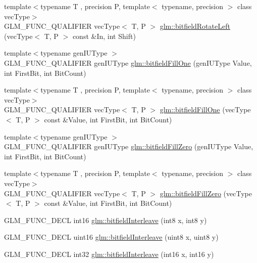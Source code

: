 \begin{DoxyCompactItemize}
\item 
{\footnotesize template$<$typename T , precision P, template$<$ typename, precision $>$ class vec\-Type$>$ }\\G\-L\-M\-\_\-\-F\-U\-N\-C\-\_\-\-Q\-U\-A\-L\-I\-F\-I\-E\-R vec\-Type$<$ T, P $>$ \hyperlink{group__gtc__bitfield_ga410d130917d85b865718e3ebc32cf0ef}{glm\-::bitfield\-Rotate\-Left} (vec\-Type$<$ T, P $>$ const \&In, int Shift)
\item 
{\footnotesize template$<$typename gen\-I\-U\-Type $>$ }\\G\-L\-M\-\_\-\-F\-U\-N\-C\-\_\-\-Q\-U\-A\-L\-I\-F\-I\-E\-R gen\-I\-U\-Type \hyperlink{group__gtc__bitfield_ga46f9295abe3b5c7658f5b13c7f819f0a}{glm\-::bitfield\-Fill\-One} (gen\-I\-U\-Type Value, int First\-Bit, int Bit\-Count)
\item 
{\footnotesize template$<$typename T , precision P, template$<$ typename, precision $>$ class vec\-Type$>$ }\\G\-L\-M\-\_\-\-F\-U\-N\-C\-\_\-\-Q\-U\-A\-L\-I\-F\-I\-E\-R vec\-Type$<$ T, P $>$ \hyperlink{group__gtc__bitfield_gad789042e84e8292ae95dc1af856f2ad5}{glm\-::bitfield\-Fill\-One} (vec\-Type$<$ T, P $>$ const \&Value, int First\-Bit, int Bit\-Count)
\item 
{\footnotesize template$<$typename gen\-I\-U\-Type $>$ }\\G\-L\-M\-\_\-\-F\-U\-N\-C\-\_\-\-Q\-U\-A\-L\-I\-F\-I\-E\-R gen\-I\-U\-Type \hyperlink{group__gtc__bitfield_ga697b86998b7d74ee0a69d8e9f8819fee}{glm\-::bitfield\-Fill\-Zero} (gen\-I\-U\-Type Value, int First\-Bit, int Bit\-Count)
\item 
{\footnotesize template$<$typename T , precision P, template$<$ typename, precision $>$ class vec\-Type$>$ }\\G\-L\-M\-\_\-\-F\-U\-N\-C\-\_\-\-Q\-U\-A\-L\-I\-F\-I\-E\-R vec\-Type$<$ T, P $>$ \hyperlink{group__gtc__bitfield_gaddba3196316b0bd240295b09b43c2958}{glm\-::bitfield\-Fill\-Zero} (vec\-Type$<$ T, P $>$ const \&Value, int First\-Bit, int Bit\-Count)
\item 
G\-L\-M\-\_\-\-F\-U\-N\-C\-\_\-\-D\-E\-C\-L int16 \hyperlink{group__gtc__bitfield_ga479134317bc95d99f2b2e235d3db287b}{glm\-::bitfield\-Interleave} (int8 x, int8 y)
\item 
G\-L\-M\-\_\-\-F\-U\-N\-C\-\_\-\-D\-E\-C\-L uint16 \hyperlink{group__gtc__bitfield_ga0700a3ceb088a0ecc23d76c154096061}{glm\-::bitfield\-Interleave} (uint8 x, uint8 y)
\item 
G\-L\-M\-\_\-\-F\-U\-N\-C\-\_\-\-D\-E\-C\-L int32 \hyperlink{group__gtc__bitfield_ga1a0264598647ae00a596865af4e1e878}{glm\-::bitfield\-Interleave} (int16 x, int16 y)

\end{DoxyCompactItemize}
